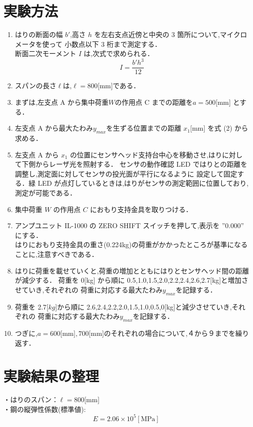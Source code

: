 \documentclass[a4paper,11pt]{jsarticle}
\begin{document}
\section{実験方法}
\begin{enumerate}
  \item はりの断面の幅 $b'$,高さ $h$ を左右支点近傍と中央の 3 箇所について,マイクロメータを使って
        小数点以下 3 桁まで測定する．\\
        \quad 断面二次モーメント $I$ は,次式で求められる．
        \begin{equation}
          I = {\dfrac{b'h^3}{12}}
        \end{equation}
  \item スパンの長さ$ \ell $は,$\ell= 800$[mm]である．
  \item まずは,左支点 A から集中荷重$ W $の作用点 C までの距離を$a = 500$[mm] とする．
  \item 左支点 A から最大たわみ$y_{max}$を生ずる位置までの距離 $x_1$[mm] を式 (2) から求める．
  \item 左支点 A から $x_1$ の位置にセンサヘッド支持台中心を移動させ,はりに対して下側からレーザ光を照射する．
        センサの動作確認 LED ではりとの距離を調整し,測定面に対してセンサの投光面が平行になるように
        設定して固定する．緑 LED が点灯しているときは,はりがセンサの測定範囲に位置しており,測定が可能である．
  \item  集中荷重 $W$ の作用点 $C$ におもり支持金具を取りつける．
  \item アンプユニット IL-1000 の ZERO SHIFT スイッチを押して,表示を ”0.000” にする．\\
        はりにおもり支持金具の重さ(0.224kg)の荷重がかかったところが基準になることに,注意すべきである．
  \item はりに荷重を載せていくと,荷重の増加とともにはりとセンサヘッド間の距離が減少する．
        荷重を 0[kg] から順に 0.5,1.0,1.5,2.0,2.2,2.4,2.6,2.7[kg]と増加させていき,それぞれの
        荷重に対応する最大たわみ$y_{max}$を記録する．
  \item 荷重を 2.7[$kg$]から順に 2.6,2.4,2.2,2.0,1.5,1.0,0.5,0[kg]と減少させていき,それぞれの
        荷重に対応する最大たわみ$y_{max}$を記録する．
  \item つぎに,$a= 600$[mm]$,700$[mm]のそれぞれの場合について,４から９までを繰り返す．
\end{enumerate}

\section{実験結果の整理}
・はりのスパン：$\ell= 800$[mm]\\
\quad・鋼の縦弾性係数(標準値):
\begin{equation}
  E = 2.06 \times 10^5 [\text{MPa}]
\end{equation}
\end{document}
